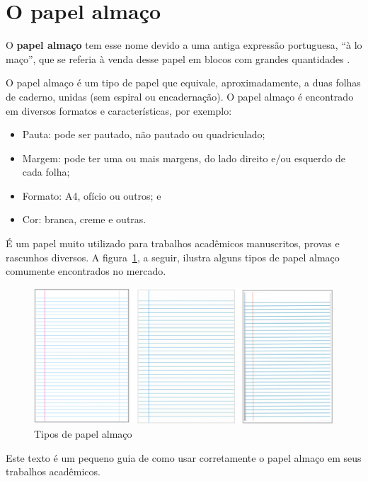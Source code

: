 \section{O papel almaço}
\label{sec:intro}

O \textbf{papel almaço} tem esse nome devido a uma antiga expressão portuguesa,
``à lo maço'', que se referia à venda desse papel em blocos com grandes
quantidades \cite{almaco2017}.

O papel almaço é um tipo de papel que equivale, aproximadamente, a duas folhas
de caderno, unidas (sem espiral ou encadernação). O papel almaço é encontrado em
diversos formatos e características, por exemplo:

\begin{itemize}
\item Pauta: pode ser pautado, não pautado ou quadriculado;
\item Margem: pode ter uma ou mais margens, do lado direito e/ou esquerdo de
      cada folha;
\item Formato: A4, ofício ou outros; e
\item Cor: branca, creme e outras.
\end{itemize}

É um papel muito utilizado para trabalhos acadêmicos manuscritos, provas e
rascunhos diversos. A figura~\ref{fig:papel}, a seguir, ilustra alguns tipos
de papel almaço comumente encontrados no mercado.

\begin{figure}[H]
\centering
\caption{Tipos de papel almaço}
\label{fig:papel}
\vspace{-0.3cm}
\includegraphics[scale=0.3]{imagens/tipos.png}
\end{figure}

Este texto é um pequeno guia de como usar corretamente o papel almaço em seus
trabalhos acadêmicos.


